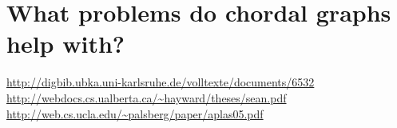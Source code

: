 \section{What problems do chordal graphs help with?}



\url{http://digbib.ubka.uni-karlsruhe.de/volltexte/documents/6532}\\
\url{http://webdocs.cs.ualberta.ca/~hayward/theses/sean.pdf}\\
\url{http://web.cs.ucla.edu/~palsberg/paper/aplas05.pdf}




